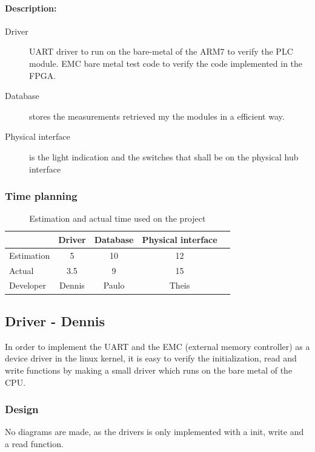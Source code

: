 \paragraph{Description:}
\begin{description}
	\item[Driver] UART driver to run on the bare-metal of the ARM7 to verify the PLC module. EMC bare metal test code to verify the code implemented in the FPGA.
	\item[Database] stores the measurements retrieved my the modules in a efficient way.
	\item[Physical interface] is the light indication and the switches that shall be on the physical hub interface
\end{description}
\subsubsection{Time planning}
\begin{table}[H]
\centering
	\begin{tabular}{|l|c|c|c|c|}
		\hline
		~			& Driver		& Database	& Physical interface\\ \hline
		Estimation	& 5			& 10			& 12					\\
		Actual		& 3.5			& 9			& 15				\\
		Developer	& Dennis		& Paulo		& Theis			\\
		\hline
	\end{tabular}
	\caption{Estimation and actual time used on the project}
\end{table}
\subsection{Driver - Dennis}
In order to implement the UART and the EMC (external memory controller) as a device driver in the linux kernel, it is easy to verify the initialization, read and write functions by making a small driver which runs on the bare metal of the CPU. 
%	
\subsubsection{Design}
No diagrams are made, as the drivers is only implemented with a init, write and a read function. 

